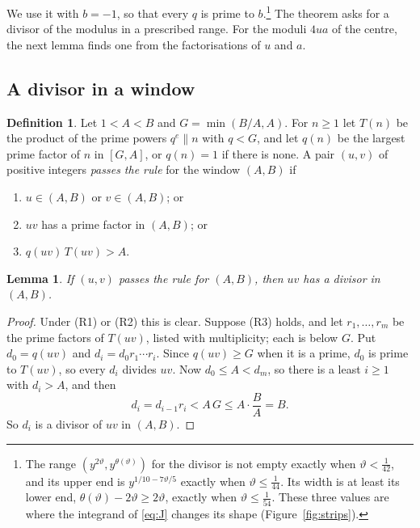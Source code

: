 \documentclass[aps,prd,twocolumn,superscriptaddress,nofootinbib,longbibliography,floatfix,showkeys,nobalancelastpage,amsmath,amssymb,10pt]{revtex4-2}
\theoremstyle{plain}
\newtheorem{lemma}[theorem]{Lemma}
\theoremstyle{definition}
\newtheorem{definition}[theorem]{Definition}
\theoremstyle{plain}
\begin{document}
We use it with $b=-1$, so that every $q$ is prime to $b$.\footnote{The range $(y^{2\vartheta},y^{\theta(\vartheta)})$ for the divisor is not empty exactly when $\vartheta<\frac1{42}$, and its upper end is $y^{1/10-7\vartheta/5}$ exactly when $\vartheta\le\frac1{44}$. Its width is at least its lower end, $\theta(\vartheta)-2\vartheta\ge2\vartheta$, exactly when $\vartheta\le\frac1{54}$. These three values are where the integrand of \eqref{eq:J} changes its shape (Figure~\ref{fig:strips}).} The theorem asks for a divisor of the modulus in a prescribed range. For the moduli $4ua$ of the centre, the next lemma finds one from the factorisations of $u$ and $a$.

\subsection{A divisor in a window}

\begin{definition}\label{def:rule}
Let $1<A<B$ and $G=\min(B/A,A)$. For $n\ge1$ let $T(n)$ be the product of the prime powers $q^e\parallel n$ with $q<G$, and let $q(n)$ be the largest prime factor of $n$ in $[G,A]$, or $q(n)=1$ if there is none. A pair $(u,v)$ of positive integers \emph{passes the rule} for the window $(A,B)$ if
\begin{enumerate}
\item[(R1)] $u\in(A,B)$ or $v\in(A,B)$; or
\item[(R2)] $uv$ has a prime factor in $(A,B)$; or
\item[(R3)] $q(uv)\,T(uv)>A$.
\end{enumerate}
\end{definition}

\begin{lemma}\label{lem:chain}
If $(u,v)$ passes the rule for $(A,B)$, then $uv$ has a divisor in $(A,B)$.
\end{lemma}

\begin{proof}
Under (R1) or (R2) this is clear. Suppose (R3) holds, and let $r_1,\dots,r_m$ be the prime factors of $T(uv)$, listed with multiplicity; each is below $G$. Put $d_0=q(uv)$ and $d_i=d_0r_1\cdots r_i$. Since $q(uv)\ge G$ when it is a prime, $d_0$ is prime to $T(uv)$, so every $d_i$ divides $uv$. Now $d_0\le A<d_m$, so there is a least $i\ge1$ with $d_i>A$, and then
\[
d_i=d_{i-1}r_i<A\,G\le A\cdot\frac BA=B.
\]
So $d_i$ is a divisor of $uv$ in $(A,B)$.
\end{proof}
\end{document}
